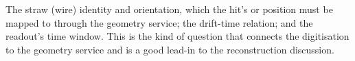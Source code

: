 \begin{solution}
The straw (wire) identity and orientation, which the hit's
 or position must be mapped to through the geometry
service; the drift-time relation; and the readout's time window. This is the
kind of question that connects the digitisation to the geometry service and
is a good lead-in to the reconstruction discussion.
\end{solution}
